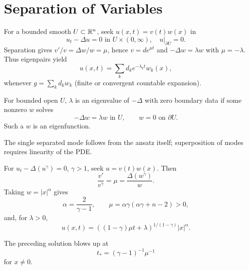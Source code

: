 \section{Separation of Variables}
\label{sec:separation-of-variables}

\begin{example}
\label{ex:heat-equation-separation-of-variables}
For a bounded smooth $U\subset\mathbb{R}^n$, seek $u(x,t)=v(t)w(x)$ in
\[
u_t-\Delta u=0\text{ in }U\times(0,\infty),\quad u|_{\partial U}=0.
\]
Separation gives $v'/v=\Delta w/w=\mu$, hence $v=de^{\mu t}$ and
$-\Delta w=\lambda w$ with $\mu=-\lambda$. Thus eigenpairs yield
\[
u(x,t)=\sum_k d_ke^{-\lambda_kt}w_k(x),
\]
whenever $g=\sum_kd_kw_k$ (finite or convergent countable expansion).
\end{example}

\begin{definition}
\label{def:eigenvalue-eigenfunction}
For bounded open $U$, $\lambda$ is an eigenvalue of $-\Delta$ with zero
boundary data if some nonzero $w$ solves
\[
-\Delta w=\lambda w\text{ in }U,\qquad w=0\text{ on }\partial U.
\]
Such a $w$ is an eigenfunction.
\end{definition}

\begin{remark}
\label{rem:separation-of-variables-linearity-remark}

The single separated mode follows from the ansatz itself; superposition of
modes requires linearity of the PDE.
\end{remark}

\begin{example}
\label{ex:porous-medium-separation-of-variables}
For $u_t-\Delta(u^\gamma)=0$, $\gamma>1$, seek $u=v(t)w(x)$. Then
\[
\frac{v'}{v^\gamma}=\mu=\frac{\Delta(w^\gamma)}{w}.
\]
Taking $w=|x|^\alpha$ gives
\[
\alpha=\frac{2}{\gamma-1},\qquad
\mu=\alpha\gamma(\alpha\gamma+n-2)>0,
\]
and, for $\lambda>0$,
\[
u(x,t)=((1-\gamma)\mu t+\lambda)^{1/(1-\gamma)}|x|^\alpha.
\]
\end{example}

\begin{remark}
\label{rem:porous-medium-blowup-remark}

The preceding solution blows up at
\[
t_*=(\gamma-1)^{-1}\mu^{-1}
\]
for $x\ne0$.
\end{remark}


